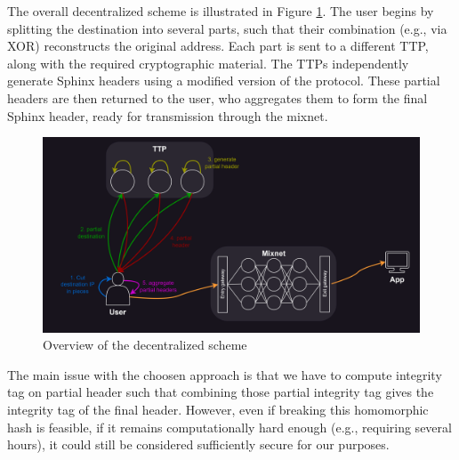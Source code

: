 The overall decentralized scheme is illustrated in Figure \ref{fig:overall_schema}. 
The user begins by splitting the destination into several parts, such that their combination (e.g., via XOR) reconstructs the original address. 
Each part is sent to a different TTP, along with the required cryptographic material. 
The TTPs independently generate Sphinx headers using a modified version of the protocol.  
These partial headers are then returned to the user, who aggregates them to form the final Sphinx header, ready for transmission through the mixnet.

\begin{figure}[H]
    \centering
    \includegraphics[width=1\linewidth]{Images/sphinx_ttp.png}
    \caption{Overview of the decentralized scheme}
    \label{fig:overall_schema}
\end{figure}


The main issue with the choosen approach is that we have to compute integrity tag on partial header such 
that combining those partial integrity tag gives the integrity tag of the final header.
However, even if breaking this homomorphic hash is feasible, if it remains computationally hard enough (e.g., requiring several hours), it could still be considered sufficiently secure for our purposes.



